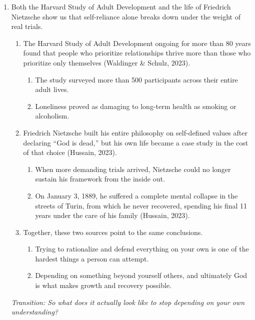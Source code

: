 \documentclass[12pt]{article}
\begin{document}
\begin{enumerate}[label=\Alph*., leftmargin=1.5cm, itemsep=0pt]
  \item Both the Harvard Study of Adult Development and the life of Friedrich Nietzsche show us that self-reliance alone breaks down under the weight of real trials.
    \begin{enumerate}[label=\arabic*., leftmargin=1cm, itemsep=0pt]
      \item The Harvard Study of Adult Development ongoing for more than 80 years found that people who prioritize relationships thrive more than those who prioritize only themselves (Waldinger \& Schulz, 2023).
        \begin{enumerate}[label=\alph*., leftmargin=1cm, itemsep=0pt]
          \item The study surveyed more than 500 participants across their entire adult lives.
          \item Loneliness proved as damaging to long-term health as smoking or alcoholism.
        \end{enumerate}
      \item Friedrich Nietzsche built his entire philosophy on self-defined values after declaring ``God is dead,'' but his own life became a case study in the cost of that choice (Hussain, 2023).
        \begin{enumerate}[label=\alph*., leftmargin=1cm, itemsep=0pt]
          \item When more demanding trials arrived, Nietzsche could no longer sustain his framework from the inside out.
          \item On January 3, 1889, he suffered a complete mental collapse in the streets of Turin, from which he never recovered, spending his final 11 years under the care of his family (Hussain, 2023).
        \end{enumerate}
      \item Together, these two sources point to the same conclusions.
        \begin{enumerate}[label=\alph*., leftmargin=1cm, itemsep=0pt]
          \item Trying to rationalize and defend everything on your own is one of the hardest things a person can attempt.
          \item Depending on something beyond yourself others, and ultimately God is what makes growth and recovery possible.
        \end{enumerate}
    \end{enumerate}

  \noindent\textit{Transition: So what does it actually look like to stop depending on your own understanding?}


\end{enumerate}
\end{document}
